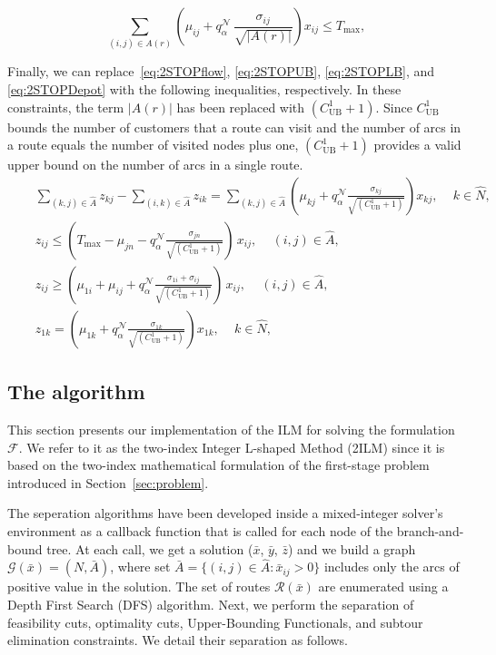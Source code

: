 \documentclass[11pt]{article}
\theoremstyle{definition}
\begin{document}
\begin{equation}
	\sum_{(i,j) \in A(r)} \left(\mu_{ij} + q^{\mathcal{N}}_{\alpha} \, \frac{\sigma_{ij}}{\sqrt{|A(r)|}}\right) x_{ij} \leq T_{\max},
  \label{eq:lin_cc}
\end{equation}

Finally, we can replace~\eqref{eq:2STOPflow}, \eqref{eq:2STOPUB}, \eqref{eq:2STOPLB}, and \eqref{eq:2STOPDepot} with the following inequalities, respectively. In these constraints, the term $|A(r)|$ has been replaced with $(C_{\text{UB}}^1 + 1)$. Since $C_{\text{UB}}^1$ bounds the number of customers that a route can visit and the number of arcs in a route equals the number of visited nodes plus one, $(C_{\text{UB}}^1 + 1)$ provides a valid upper bound on the number of arcs in a single route.
%
\begin{align*}
	\quad & \sum_{(k,j) \in \hat{A}} z_{kj} - \sum_{(i,k) \in \hat{A}} z_{ik} = \sum_{(k,j) \in \hat{A}} \left( \mu_{kj} + q^{\mathcal{N}}_{\alpha} \frac{\sigma_{kj}}{\sqrt{(C_{\text{UB}}^1 + 1)}} \right) x_{kj}, \quad \, k \in \hat{N},\\
	\quad & z_{ij} \leq \left(T_{\max} - \mu_{jn} - q^{\mathcal{N}}_{\alpha} \frac{\sigma_{jn}}{\sqrt{(C_{\text{UB}}^1 + 1)}}\right) \, x_{ij}, \quad \, (i,j) \in \hat{A},\\
	\quad & z_{ij} \geq \left(\mu_{1i} + \mu_{ij} + q^{\mathcal{N}}_{\alpha} \frac{\sigma_{1i} + \sigma_{ij}}{\sqrt{(C_{\text{UB}}^1 + 1)}}\right) \, x_{ij}, \quad \, (i,j) \in \hat{A},\\
	\quad & z_{1k} = \left(\mu_{1k} + q^{\mathcal{N}}_{\alpha} \frac{\sigma_{1k}}{\sqrt{(C_{\text{UB}}^1 + 1)}} \right) x_{1k}, \quad \, k \in \hat{N},
\end{align*}

\subsection{The algorithm}
\label{algorithm2}

This section presents our implementation of the ILM for solving the formulation $\mathscr{F}$. We refer to it as the two-index Integer L-shaped Method (2ILM) since it is based on the two-index mathematical formulation of the first-stage problem introduced in Section~\ref{sec:problem}.

The seperation algorithms have been developed inside a mixed-integer solver's environment as a callback function that is called for each node of the branch-and-bound tree. At each call, we get a solution ($\bar{x}$, $\bar{y}$, $\bar{z}$) and we build a graph $\mathcal{G}(\bar{x}) = (N, \bar{A})$, where set $\bar{A} = \{(i, j) \in \hat{A} : \bar{x}_{ij} > 0\}$ includes only the arcs of positive value in the solution. The set of routes $\mathcal{R}(\bar{x})$ are enumerated using a Depth First Search (DFS) algorithm. Next, we perform the separation of feasibility cuts, optimality cuts, Upper-Bounding Functionals, and subtour elimination constraints. We detail their separation as follows.
\end{document}
